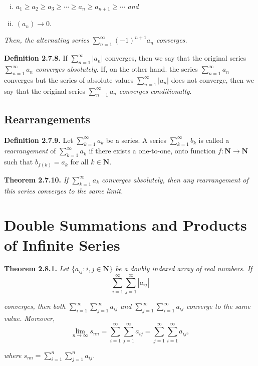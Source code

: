 \documentclass[12pt]{report}
\newcommand{\N}{\textbf{N}}
\begin{document}
\begin{enumerate}[(i)]
\item $a_1\geq a_2\geq a_3\geq\cdots\geq a_n\geq a_{n+1}\geq\cdots$ \textit{and}
\item $(a_n)\rightarrow 0.$
\end{enumerate}

\noindent \textit{Then, the alternating series $\sum_{n=1}^\infty(-1)^{n+1}a_n$ converges.}
\bigskip

\noindent \textbf{Definition 2.7.8.} If $\sum_{n=1}^\infty |a_n|$ converges, then we say that the original series $\sum_{n=1}^\infty a_n$ \textit{converges absolutely}.  If, on the other hand. the series $\sum_{n=1}^\infty a_n$ converges but the series of absolute values $\sum_{n=1}^\infty |a_n|$ does not converge, then we say that the original series $\sum_{n=1}^\infty a_n$ \textit{converges conditionally}.
\bigskip

\subsection*{Rearrangements}

\noindent \textbf{Definition 2.7.9.} Let $\sum_{k=1}^\infty a_k$ be a series.  A series $\sum_{k=1}^\infty b_k$ is called a \textit{rearrangement} of $\sum_{k=1}^\infty a_k$ if there exists a one-to-one, onto function $f:\N\rightarrow\N$ such that $b_{f(k)}=a_k$ for all $k\in\N$.
\bigskip

\noindent \textbf{Theorem 2.7.10.} \textit{If $\sum_{k=1}^\infty a_k$ converges absolutely, then any rearrangement of this series converges to the same limit.}
\bigskip

\section{Double Summations and Products of Infinite Series}

\noindent \textbf{Theorem 2.8.1.} \textit{Let $\{a_{ij}:i,j\in\N\}$ be a doubly indexed array of real numbers.  If}
\[\sum_{i=1}^\infty\sum_{j=1}^\infty|a_{ij}|\]

\noindent \textit{converges, then both $\sum_{i=1}^\infty\sum_{j=1}^\infty a_{ij}$ and $\sum_{j=1}^\infty\sum_{i=1}^\infty a_{ij}$ converge to the same value.  Moreover,}
\[\lim_{n\rightarrow\infty} s_{nn}=\sum_{i=1}^\infty\sum_{j=1}^\infty a_{ij}=\sum_{j=1}^\infty\sum_{i=1}^\infty a_{ij},\]

\noindent \textit{where $s_{nn}=\sum_{i=1}^n\sum_{j=1}^n a_{ij}$.}
\bigskip
\end{document}
